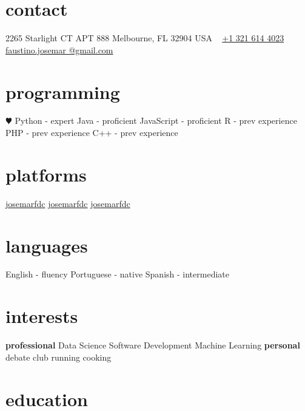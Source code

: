 \documentclass[]{cv-style}          %
\begin{document}
\lastupdated

\vspace{-0.2cm}
\begin{aside}
%
\vspace{-0.1cm}
\section{contact}
2265 Starlight CT
APT 888
Melbourne, FL 32904
USA
~
\href{tel:+13216144023}{+1 321 614 4023}
~
\href{mailto:faustino.josemar@gmail.com}{{faustino.josemar
@gmail.com}}
%
\section{programming}
{\color{red} $\varheartsuit$}
Python - expert
Java - proficient
JavaScript - proficient
R - prev experience
PHP - prev experience
C++ - prev experience
%
%
\section{platforms}
\href{https://github.com/josemarfdc}{{\huge \faGithub}{ josemarfdc}}
\href{https://www.linkedin.com/in/josemarfdc}{{\huge \faLinkedin}{ josemarfdc}}
\href{https://twitter.com/josemarfdc}{{\huge \faTwitter}{ josemarfdc}}
\section{languages}
English - fluency
Portuguese - native
Spanish - intermediate
%
\section{interests}
\vspace{0.5cm}
\textbf{professional}
Data Science
Software Development
Machine Learning
\vspace{0.5cm}
\textbf{personal}
debate club
running
cooking
%
\end{aside}

\section{education}
\end{document}
